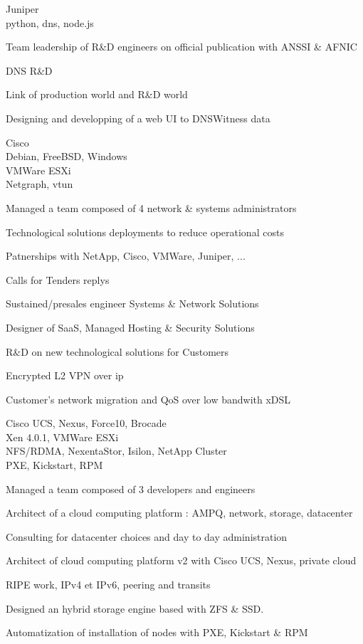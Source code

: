 \documentclass[a4paper,11pt]{cv4tw}%
\begin{document}
	{Juniper\\python, dns, node.js}
		{
		\begin{missions}
			\item Team leadership of R\&D engineers on official publication with ANSSI \& AFNIC
			\item DNS R\&D
			\item Link of production world and R\&D world
			\item Designing and developping of a web UI to DNSWitness data
		\end{missions}
	}


	{Cisco\\Debian, FreeBSD, Windows\\VMWare ESXi\\Netgraph, vtun}
		{
		\begin{missions}
			\item Managed a team composed of 4 network \& systems administrators
			\item Technological solutions deployments to reduce operational costs
			\item Patnerships with NetApp, Cisco, VMWare, Juniper, ...
			\item Calls for Tenders replys
			\item Sustained/presales engineer Systems \& Network Solutions
			\item Designer of SaaS, Managed Hosting \& Security Solutions
			\item R\&D on new technological solutions for Customers
			\item Encrypted L2 VPN over ip
			\item Customer's network migration and QoS over low bandwith xDSL
		\end{missions}
	}


	{Cisco UCS, Nexus, Force10, Brocade\\Xen 4.0.1, VMWare ESXi\\NFS/RDMA, NexentaStor, Isilon, NetApp Cluster\\PXE, Kickstart, RPM}
		{
		\begin{missions}
			\item Managed a team composed of 3 developers and engineers
			\item Architect of a cloud computing platform : AMPQ, network, storage, datacenter
			\item Consulting for datacenter choices and day to day administration
			\item Architect of cloud computing platform v2 with Cisco UCS, Nexus, private cloud
			\item RIPE work, IPv4 et IPv6, peering and transits
			\item Designed an hybrid storage engine based with ZFS \& SSD.
			\item Automatization of installation of nodes with PXE, Kickstart \& RPM
		\end{missions}
	}
\end{document}
